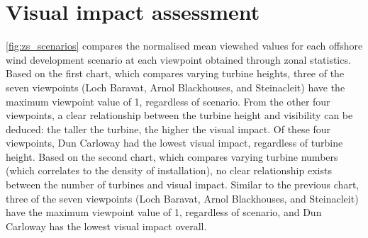 \section{Visual impact assessment}

\autoref{fig:zs_scenarios} compares the normalised mean viewshed values for each offshore wind development scenario at each viewpoint obtained through zonal statistics. Based on the first chart, which compares varying turbine heights, three of the seven viewpoints (Loch Baravat, Arnol Blackhouses, and Steinacleit) have the maximum viewpoint value of 1, regardless of scenario. From the other four viewpoints, a clear relationship between the turbine height and visibility can be deduced: the taller the turbine, the higher the visual impact. Of these four viewpoints, Dun Carloway had the lowest visual impact, regardless of turbine height. Based on the second chart, which compares varying turbine numbers (which correlates to the density of installation), no clear relationship exists between the number of turbines and visual impact. Similar to the previous chart, three of the seven viewpoints (Loch Baravat, Arnol Blackhouses, and Steinacleit) have the maximum viewpoint value of 1, regardless of scenario, and Dun Carloway has the lowest visual impact overall.

